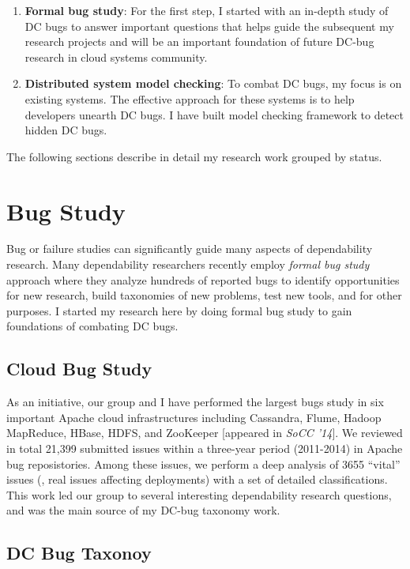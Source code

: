 \documentclass[11pt]{article}
\begin{document}
\begin{enumerate}

\item \textbf{Formal bug study}: For the first step, I started with an in-depth
study of DC bugs to answer important questions that helps guide the subsequent
my research projects and will be an important foundation of future DC-bug
research in cloud systems community.

\item \textbf{Distributed system model checking}: To combat DC bugs, my focus is
on existing systems. The effective approach for these systems is to help
developers unearth DC bugs. I have built model checking framework to detect
hidden DC bugs. 

\end{enumerate}

The following sections describe in detail my research work grouped by status.
\fi

\section{Bug Study}

Bug or failure studies can significantly guide many aspects of dependability
research. Many dependability researchers recently employ \textit{formal bug
study} approach where they analyze hundreds of reported bugs to identify
opportunities for new research, build taxonomies of new problems, test new
tools, and for other purposes. I started my research here by doing formal bug
study to gain foundations of combating DC bugs.

\subsection{Cloud Bug Study}

As an initiative, our group and I have performed the largest bugs study in six
important Apache cloud infrastructures including Cassandra, Flume, Hadoop
MapReduce, HBase, HDFS, and ZooKeeper [appeared in \textit{SoCC '14}]. We
reviewed in total 21,399 submitted issues within a three-year period (2011-2014)
in Apache bug reposistories. Among these issues, we perform a deep analysis of
3655 ``vital'' issues (\ie, real issues affecting deployments) with a set of
detailed classifications. This work led our group to several interesting
dependability research questions, and was the main source of my DC-bug taxonomy
work.

\subsection{DC Bug Taxonoy} 
\end{document}
